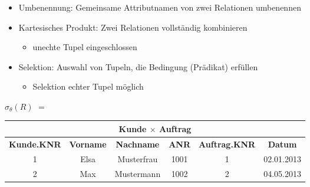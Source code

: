 \begin{frame}\frametitle{\insertsection}
\framesubtitle{\insertsubsection}
\begin{itemize}
	\item Umbenennung: Gemeinsame Attributnamen von zwei Relationen umbenennen\\[5pt]
	\item Kartesisches Produkt: Zwei Relationen vollst\"andig kombinieren 
	\begin{itemize}
		\item unechte Tupel eingeschlossen\\[5pt]
	\end{itemize}
	\item Selektion: Auswahl von Tupeln, die Bedingung (Prädikat) erfüllen
	\begin{itemize}
		\item Selektion echter Tupel m\"oglich
	\end{itemize}
\end{itemize}
\begin{center}
	$\sigma_{\theta}(R)$ $=$
	\begin{tabular}{|c|c|c|c|c|c|}\hline
		\multicolumn{6}{|c|}{\footnotesize \textbf{Kunde $\times$ Auftrag}}\\\hline\hline
		\footnotesize{\textbf{Kunde.KNR}} & \footnotesize{\textbf{Vorname}} & \footnotesize{\textbf{Nachname}} 
		  &\footnotesize{\textbf{ANR}} & \footnotesize{\textbf{Auftrag.KNR}}&\footnotesize{\textbf{Datum}}\\\hline
		1 &Elsa &Musterfrau &1001  &1 &02.01.2013\\\hline
		2 &Max &Mustermann &1002  &2&04.05.2013\\\hline
	\end{tabular}
\end{center}
\end{frame}

